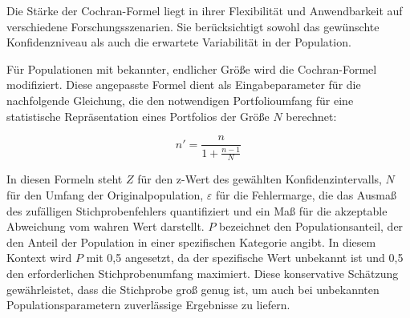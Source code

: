 Die Stärke der Cochran-Formel liegt in ihrer Flexibilität und Anwendbarkeit auf verschiedene Forschungsszenarien. Sie berücksichtigt sowohl das gewünschte Konfidenzniveau als auch die erwartete Variabilität in der Population.

Für Populationen mit bekannter, endlicher Größe wird die Cochran-Formel modifiziert. Diese angepasste Formel dient als Eingabeparameter für die nachfolgende Gleichung, die den notwendigen Portfolioumfang für eine statistische Repräsentation eines Portfolios der Größe $N$ berechnet:

\begin{equation}
n' = \frac{n}{1 + \frac{n - 1}{N}}
\label{eq:finite_population}
\end{equation}

In diesen Formeln steht $Z$ für den z-Wert des gewählten Konfidenzintervalls, $N$ für den Umfang der Originalpopulation, $\varepsilon$ für die Fehlermarge, die das Ausmaß des zufälligen Stichprobenfehlers quantifiziert und ein Maß für die akzeptable Abweichung vom wahren Wert darstellt. $P$ bezeichnet den Populationsanteil, der den Anteil der Population in einer spezifischen Kategorie angibt. In diesem Kontext wird $P$ mit 0,5 angesetzt, da der spezifische Wert unbekannt ist und 0,5 den erforderlichen Stichprobenumfang maximiert. Diese konservative Schätzung gewährleistet, dass die Stichprobe groß genug ist, um auch bei unbekannten Populationsparametern zuverlässige Ergebnisse zu liefern.